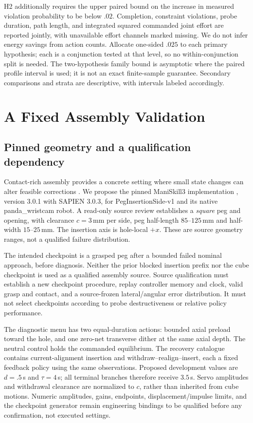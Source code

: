 \documentclass[conference]{IEEEtran}
\begin{document}
H2 additionally requires the upper paired bound on the increase in measured violation probability to be below $.02$. Completion, constraint violations, probe duration, path length, and integrated squared commanded joint effort are reported jointly, with unavailable effort channels marked missing. We do not infer energy savings from action counts. Allocate one-sided $.025$ to each primary hypothesis; each is a conjunction tested at that level, so no within-conjunction split is needed. The two-hypothesis family bound is asymptotic where the paired profile interval is used; it is not an exact finite-sample guarantee. Secondary comparisons and strata are descriptive, with intervals labeled accordingly.

\section{A Fixed Assembly Validation}
\subsection{Pinned geometry and a qualification dependency}
Contact-rich assembly provides a concrete setting where small state changes can alter feasible corrections \citep{tang2023}. We propose the pinned ManiSkill3 implementation \citep{tao2025}, version 3.0.1 with SAPIEN 3.0.3, for PegInsertionSide-v1 and its native panda\_wristcam robot. A read-only source review establishes a \emph{square} peg and opening, with clearance $c=3$\,mm per side, peg half-length $85$--$125$\,mm and half-width $15$--$25$\,mm. The insertion axis is hole-local $+x$. These are source geometry ranges, not a qualified failure distribution.

The intended checkpoint is a grasped peg after a bounded failed nominal approach, before diagnosis. Neither the prior blocked insertion prefix nor the cube checkpoint is used as a qualified assembly source. Source qualification must establish a new checkpoint procedure, replay controller memory and clock, valid grasp and contact, and a source-frozen lateral/angular error distribution. It must not select checkpoints according to probe destructiveness or relative policy performance.

The diagnostic menu has two equal-duration actions: bounded axial preload toward the hole, and one zero-net transverse dither at the same axial depth. The neutral control holds the commanded equilibrium. The recovery catalogue contains current-alignment insertion and withdraw--realign--insert, each a fixed feedback policy using the same observations. Proposed development values are $d=.5$\,s and $\tau=4$\,s; all terminal branches therefore receive $3.5$\,s. Servo amplitudes and withdrawal clearance are normalized to $c$, rather than inherited from cube motions. Numeric amplitudes, gains, endpoints, displacement/impulse limits, and the checkpoint generator remain engineering bindings to be qualified before any confirmation, not executed settings.
\end{document}
